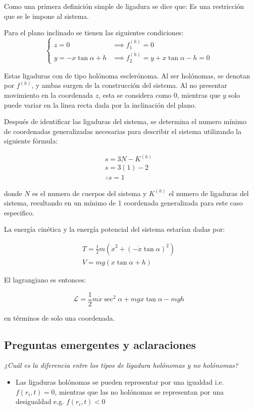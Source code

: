 \documentclass{article}
\theoremstyle{definition}
\begin{document}
Como una primera definición simple de ligadura se dice que: Es una restricción que se le impone al sistema.

Para el plano inclinado se tienen las siguientes condiciones:
\begin{equation}
	\begin{cases}
		z = 0 &\implies f_1^{(h)} = 0 \\
		y = -x\tan{\alpha} + h &\implies f_2^{(h)} = y + x\tan{\alpha} - h = 0
	\end{cases}
\end{equation}

Estas ligaduras con de tipo holónoma esclerónoma. Al ser holónomas, se denotan por $f^{(h)}$, y ambas surgen de la construcción del sistema. Al no presentar movimiento en la coordenada $z$, esta se considera como $0$, mientras que $y$ solo puede variar en la linea recta dada por la inclinación del plano.

Después de identificar las ligaduras del sistema, se determina el numero mínimo de coordenadas generalizadas necesarias para describir el sistema utilizando la siguiente fórmula:

\begin{gather}
	s = 3N - K^{(h)} \label{eq:minim_coordinates}\\
	s = 3(1) - 2 \\
	\therefore s = 1
\end{gather}

donde $N$ es el numero de cuerpos del sistema y $K^{(h)}$ el numero de ligaduras del sistema, resultando en un mínimo de 1 coordenada generalizada para este caso especifico.

La energía cinética y la energía potencial del sistema estarían dadas por:

\begin{gather}
	T = \frac{1}{2} m \left(\dot{x}^2 + (-\dot{x}\tan{\alpha})^2 \right) \\
	V = mg\left(x\tan{\alpha} + h \right)
\end{gather}

El lagrangiano es entonces:

\begin{equation}
	\mathcal{L} = \frac{1}{2}m\dot{x}\sec^2{\alpha} + mgx\tan{\alpha} - mgh
\end{equation}

en términos de solo una coordenada.

\subsection{Preguntas emergentes y aclaraciones}
\emph{¿Cuál es la diferencia entre los tipos de ligadura holónomas y no holónomas?}
\begin{itemize}
	\item Las ligaduras holónomas se pueden representar por una igualdad i.e. $f(r_i, t) = 0$, mientras que las no holónomas se representan por una desigualdad e.g. $f(r_i, t) < 0$
\end{itemize}
\end{document}
